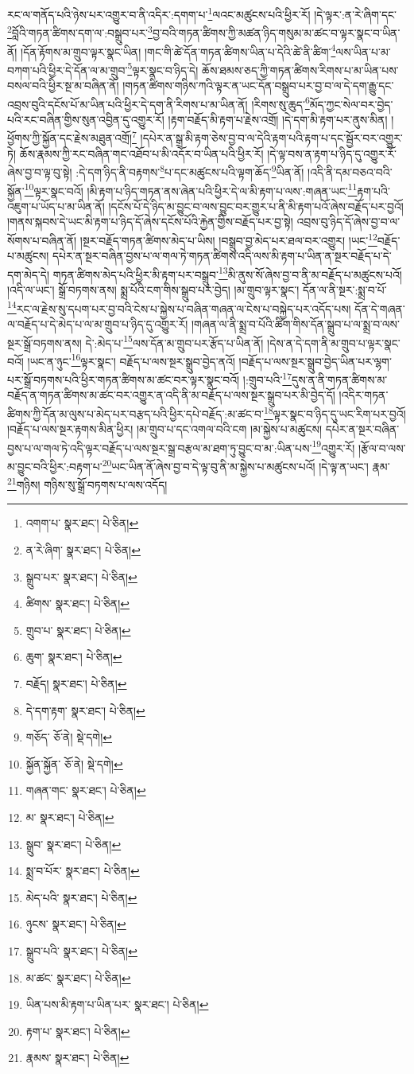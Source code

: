 རང་ལ་གནོད་པའི་ཉེས་པར་འགྱུར་བ་ནི་འདིར་:དགག་པ་\footnote{འགག་པ་  སྣར་ཐང་།  པེ་ཅིན། }ལའང་མཚུངས་པའི་ཕྱིར་རོ། །དེ་ལྟར་:ན་རེ་ཞིག་དང་\footnote{ན་རེ་ཞིག་  སྣར་ཐང་།  པེ་ཅིན། }བློའི་གཏན་ཚིགས་དག་ལ་:བསྒྲུབ་པར་\footnote{སྒྲུབ་པར་  སྣར་ཐང་།  པེ་ཅིན། }བྱ་བའི་གཏན་ཚིགས་ཀྱི་མཚན་ཉིད་གསུམ་མ་ཚང་བ་ལྟར་སྣང་བ་ཡིན་ནོ། །དོན་རྟོགས་མ་གྲུབ་ལྟར་སྣང་ཡིན། །གང་གི་ཚེ་དོན་གཏན་ཚིགས་ཡིན་པ་དེའི་ཚེ་ནི་ཚིག་\footnote{ཚིགས་  སྣར་ཐང་།  པེ་ཅིན། }ལས་ཡིན་པ་མ་བཀག་པའི་ཕྱིར་དེ་དོན་ལ་མ་གྲུབ་\footnote{གྲུབ་པ་  སྣར་ཐང་།  པེ་ཅིན། }ལྟར་སྣང་བ་ཉིད་དེ། ཆོས་ཐམས་ཅད་ཀྱི་གཏན་ཚིགས་རིགས་པ་མ་ཡིན་པས་བསལ་བའི་ཕྱིར་སྔ་མ་བཞིན་ནོ། །གཏན་ཚིགས་གཉིས་ཀའི་ལྟར་ན་ཡང་དོན་བསྒྲུབ་པར་བྱ་བ་ལ་དེ་དག་རྒྱུ་དང་འབྲས་བུའི་དངོས་པོ་མ་ཡིན་པའི་ཕྱིར་དེ་དག་ནི་རིགས་པ་མ་ཡིན་ནོ། །རིགས་སུ་ཆུད་\footnote{ཆུག་  སྣར་ཐང་།  པེ་ཅིན། }མོད་ཀྱང་སེལ་བར་བྱེད་པའི་རང་བཞིན་གྱིས་སུན་འབྱིན་དུ་འགྱུར་རོ། །རྟག་བརྗོད་མི་རྟག་པ་རྗེས་འགྲོ། །དེ་དག་མི་རྟག་པར་ནུས་མིན། །ཕྱོགས་ཀྱི་སྐྱོན་དང་རྗེས་མཐུན་འགྲོ།\footnote{བརྗོད།  སྣར་ཐང་།  པེ་ཅིན། } །དཔེར་ན་སྒྲ་མི་རྟག་ཅེས་བྱ་བ་ལ་དེའི་རྟག་པའི་རྟག་པ་དང་སྦྱོར་བར་འགྱུར་ཏེ། ཆོས་རྣམས་ཀྱི་རང་བཞིན་གང་འཐོབ་པ་མི་འདོར་བ་ཡིན་པའི་ཕྱིར་རོ། །དེ་ལྟ་བས་ན་རྟག་པ་ཉིད་དུ་འགྱུར་རོ་ཞེས་བྱ་བ་ལྟ་བུ་སྟེ། :དེ་དག་ཉིད་ནི་བརྟགས་\footnote{དེ་དག་རྟག་  སྣར་ཐང་།  པེ་ཅིན། }པ་དང་མཚུངས་པའི་ལྟག་ཆོད་\footnote{གཅོད་  ཅོ་ནེ།  སྡེ་དགེ། }ཡིན་ནོ། །འདི་ནི་དམ་བཅའ་བའི་སྐྱོན་\footnote{སྐྱོན་སྐྱོན་  ཅོ་ནེ།  སྡེ་དགེ། }ལྟར་སྣང་བའོ། །མི་རྟག་པ་ཉིད་གཏན་ནས་ཞེན་པའི་ཕྱིར་དེ་ལ་མི་རྟག་པ་ལས་:གཞན་ཡང་\footnote{གཞན་གང་  སྣར་ཐང་།  པེ་ཅིན། }རྟག་པའི་འཇུག་པ་ཡོད་པ་མ་ཡིན་ནོ། །དངོས་པོ་དེ་ཉིད་མ་བྱུང་བ་ལས་བྱུང་བར་གྱུར་པ་ནི་མི་རྟག་པའོ་ཞེས་བརྗོད་པར་བྱའོ། །གནས་སྐབས་དེ་ཡང་མི་རྟག་པ་ཉིད་དོ་ཞེས་དངོས་པོའི་རྐྱེན་གྱིས་བརྗོད་པར་བྱ་སྟེ། འབྲས་བུ་ཉིད་དོ་ཞེས་བྱ་བ་ལ་སོགས་པ་བཞིན་ནོ། །སྔར་བརྗོད་གཏན་ཚིགས་མེད་པ་ཡིས། །བསྒྲུབ་བྱ་མེད་པར་ཐལ་བར་འགྱུར། །ཡང་\footnote{མ་  སྣར་ཐང་།  པེ་ཅིན། }བརྗོད་པ་མཚུངས། དཔེར་ན་སྔར་བཞིན་བྱས་པ་ལ་གལ་ཏེ་གཏན་ཚིགས་འདི་ལས་མི་རྟག་པ་ཡིན་ན་སྔར་བརྗོད་པ་དེ་དག་མེད་དེ། གཏན་ཚིགས་མེད་པའི་ཕྱིར་མི་རྟག་པར་བསྒྲུབ་\footnote{སྒྲུབ་  སྣར་ཐང་།  པེ་ཅིན། }མི་ནུས་སོ་ཞེས་བྱ་བ་ནི་མ་བརྗོད་པ་མཚུངས་པའོ། །འདི་ལ་ཡང་། སྒྲོ་བཏགས་ནས། སྨྲ་པོའི་ངག་གིས་སྒྲུབ་པར་བྱེད། །མ་གྲུབ་ལྟར་སྣང་། དོན་ལ་ནི་སྔར་:སྨྲ་བ་པོ་\footnote{སྨྲ་བ་པོར་  སྣར་ཐང་།  པེ་ཅིན། }རང་ལ་རྗེས་སུ་དཔག་པར་བྱ་བའི་ངེས་པ་སྐྱེས་པ་བཞིན་གཞན་ལ་ངེས་པ་བསྐྱེད་པར་འདོད་པས། དོན་དེ་གཞན་ལ་བརྗོད་པ་དེ་མེད་པ་ལ་མ་གྲུབ་པ་ཉིད་དུ་འགྱུར་རོ། །གཞན་ལ་ནི་སྨྲ་བ་པོའི་ཚིག་གིས་དོན་སྒྲུབ་པ་ལ་སྨྲ་བ་ལས་སྔར་སྒྲོ་བཏགས་ནས། དེ་:མེད་པ་\footnote{མེད་པའི་  སྣར་ཐང་།  པེ་ཅིན། }ལས་དོན་མ་གྲུབ་པར་རྩོད་པ་ཡིན་ནོ། །དེས་ན་དེ་དག་ནི་མ་གྲུབ་པ་ལྟར་སྣང་བའོ། །ཡང་ན་ཉུང་\footnote{ཉུངས་  སྣར་ཐང་།  པེ་ཅིན། }ལྟར་སྣང་། བརྗོད་པ་ལས་སྔར་སྒྲུབ་བྱེད་ནའོ། །བརྗོད་པ་ལས་སྔར་སྒྲུབ་བྱེད་ཡིན་པར་ལྷག་པར་སྒྲོ་བཏགས་པའི་ཕྱིར་གཏན་ཚིགས་མ་ཚང་བར་ལྟར་སྣང་བའོ། །:གྲུབ་པའི་\footnote{སྒྲུབ་པའི་  སྣར་ཐང་།  པེ་ཅིན། }དུས་ན་ནི་གཏན་ཚིགས་མ་བརྗོད་ན་གཏན་ཚིགས་མ་ཚང་བར་འགྱུར་ན་འདི་ནི་མ་བརྗོད་པ་ལས་སྔར་སྒྲུབ་པར་མི་བྱེད་དོ། །འདིར་གཏན་ཚིགས་ཀྱི་དོན་མ་ལུས་པ་མེད་པར་བརྩད་པའི་ཕྱིར་དཔེ་བརྗོད་:མ་ཚང་བ་\footnote{མ་ཚང་  སྣར་ཐང་།  པེ་ཅིན། }ལྟར་སྣང་བ་ཉིད་དུ་ཡང་རིག་པར་བྱའོ། །བརྗོད་པ་ལས་སྔར་རྟགས་མིན་ཕྱིར། །མ་གྲུབ་པ་དང་འགལ་བའི་ངག །མ་སྐྱེས་པ་མཚུངས། དཔེར་ན་སྔར་བཞིན་བྱས་པ་ལ་གལ་ཏེ་འདི་ལྟར་བརྗོད་པ་ལས་སྔར་སྒྲ་བརྩལ་མ་ཐག་ཏུ་བྱུང་བ་མ་:ཡིན་པས་\footnote{ཡིན་པས་མི་རྟག་པ་ཡིན་པར་  སྣར་ཐང་།  པེ་ཅིན། }འགྱུར་རོ། །རྩོལ་བ་ལས་མ་བྱུང་བའི་ཕྱིར་:བརྟག་པ་\footnote{རྟག་པ་  སྣར་ཐང་།  པེ་ཅིན། }ཡང་ཡིན་ནོ་ཞེས་བྱ་བ་དེ་ལྟ་བུ་ནི་མ་སྐྱེས་པ་མཚུངས་པའོ། །དེ་ལྟ་ན་ཡང་། རྣམ་\footnote{རྣམས་  སྣར་ཐང་།  པེ་ཅིན། }གཉིས། གཉིས་སུ་སྒྲོ་བཏགས་པ་ལས་འདོད། 